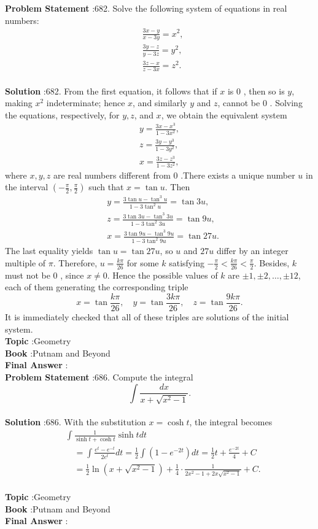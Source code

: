 \documentclass[10pt]{article}
\begin{document}
\textbf{Problem Statement} :682. Solve the following system of equations in real numbers:$$ \begin{aligned} &\frac{3 x-y}{x-3 y}=x^{2}, \\ &\frac{3 y-z}{y-3 z}=y^{2}, \\ &\frac{3 z-x}{z-3 x}=z^{2} . \end{aligned} $$\\
\textbf{Solution} :682. From the first equation, it follows that if $x$ is 0 , then so is $y$, making $x^{2}$ indeterminate; hence $x$, and similarly $y$ and $z$, cannot be 0 . Solving the equations, respectively, for $y, z$, and $x$, we obtain the equivalent system$$ \begin{gathered} y=\frac{3 x-x^{3}}{1-3 x^{2}}, \\ z=\frac{3 y-y^{3}}{1-3 y^{2}}, \\ x=\frac{3 z-z^{3}}{1-3 z^{2}}, \end{gathered} $$where $x, y, z$ are real numbers different from 0 .There exists a unique number $u$ in the interval $\left(-\frac{\pi}{2}, \frac{\pi}{2}\right)$ such that $x=\tan u$. Then$$ \begin{aligned} &y=\frac{3 \tan u-\tan ^{3} u}{1-3 \tan ^{2} u}=\tan 3 u, \\ &z=\frac{3 \tan 3 u-\tan ^{3} 3 u}{1-3 \tan ^{2} 3 u}=\tan 9 u, \\ &x=\frac{3 \tan 9 u-\tan ^{3} 9 u}{1-3 \tan ^{2} 9 u}=\tan 27 u . \end{aligned} $$The last equality yields $\tan u=\tan 27 u$, so $u$ and $27 u$ differ by an integer multiple of $\pi$. Therefore, $u=\frac{k \pi}{26}$ for some $k$ satisfying $-\frac{\pi}{2}<\frac{k \pi}{26}<\frac{\pi}{2}$. Besides, $k$ must not be 0 , since $x \neq 0$. Hence the possible values of $k$ are $\pm 1, \pm 2, \ldots, \pm 12$, each of them generating the corresponding triple$$ x=\tan \frac{k \pi}{26}, \quad y=\tan \frac{3 k \pi}{26}, \quad z=\tan \frac{9 k \pi}{26} . $$It is immediately checked that all of these triples are solutions of the initial system.\\
\textbf{Topic} :Geometry\\
\textbf{Book} :Putnam and Beyond\\
\textbf{Final Answer} :\\


\textbf{Problem Statement} :686. Compute the integral$$ \int \frac{d x}{x+\sqrt{x^{2}-1}} . $$\\
\textbf{Solution} :686. With the substitution $x=\cosh t$, the integral becomes$$ \begin{aligned} &\int \frac{1}{\sinh t+\cosh t} \sinh t d t \\ &\quad=\int \frac{e^{t}-e^{-t}}{2 e^{t}} d t=\frac{1}{2} \int\left(1-e^{-2 t}\right) d t=\frac{1}{2} t+\frac{e^{-2 t}}{4}+C \\ &\quad=\frac{1}{2} \ln \left(x+\sqrt{x^{2}-1}\right)+\frac{1}{4} \cdot \frac{1}{2 x^{2}-1+2 x \sqrt{x^{2}-1}}+C . \end{aligned} $$\\
\textbf{Topic} :Geometry\\
\textbf{Book} :Putnam and Beyond\\
\textbf{Final Answer} :\\
\end{document}
